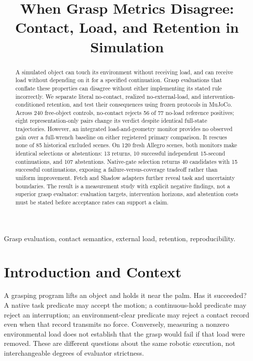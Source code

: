 \documentclass[conference,10pt,letterpaper]{IEEEtran}
\title{When Grasp Metrics Disagree:\\Contact, Load, and Retention in Simulation}
\author{\IEEEauthorblockN{Anonymous Author}}
\author{\IEEEauthorblockN{Teo Ee Hern}\IEEEauthorblockA{Tianjin University\\eehern27@gmail.com}}
\begin{document}
\maketitle
\begin{abstract}
A simulated object can touch its environment without receiving load, and can
receive load without depending on it for a specified continuation. Grasp
evaluations that conflate these properties can disagree without either
implementing its stated rule incorrectly. We separate literal no-contact,
realized no-external-load, and intervention-conditioned retention, and test
their consequences using frozen protocols in MuJoCo. Across 240 free-object
controls, no-contact rejects 56 of 77 no-load reference positives; eight
representation-only pairs change its verdict despite identical full-state
trajectories. However, an integrated load-and-geometry monitor provides no
observed gain over a full-wrench baseline on either registered primary
comparison. It rescues none of 85 historical excluded scenes. On 120 fresh
Allegro scenes, both monitors make identical selections or abstentions: 13
returns, 10 successful independent 15-second continuations, and 107 abstentions.
Native-gate selection returns 40 candidates with 15 successful continuations,
exposing a failure-versus-coverage tradeoff rather than uniform improvement.
Fetch and Shadow adapters further reveal task and uncertainty boundaries.
The result is a measurement study with explicit negative findings, not a
superior grasp evaluator: evaluation targets, intervention horizons, and
abstention costs must be stated before acceptance rates can support a claim.
\end{abstract}
\begin{IEEEkeywords}
Grasp evaluation, contact semantics, external load, retention, reproducibility.
\end{IEEEkeywords}

\section{Introduction and Context}
A grasping program lifts an object and holds it near the palm. Has it
succeeded? A native task predicate may accept the motion; a continuous-hold
predicate may reject an interruption; an environment-clear predicate may
reject a contact record even when that record transmits no force. Conversely,
measuring a nonzero environmental load does not establish that the grasp would
fail if that load were removed. These are different questions about the same
robotic execution, not interchangeable degrees of evaluator strictness.
\end{document}
